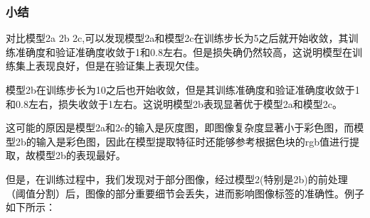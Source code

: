 \subsubsection{小结}
对比模型2a 2b 2c,可以发现模型2a和模型2c在训练步长为5之后就开始收敛，其训练准确度和验证准确度收敛于1和0.8左右。但是损失确仍然较高，这说明模型在训练集上表现良好，但是在验证集上表现欠佳。

模型2b在训练步长为10之后也开始收敛，但是其训练准确度和验证准确度收敛于1和0.8左右，损失收敛于1左右。这说明模型2b表现显著优于模型2a和模型2c。

这可能的原因是模型2a和2c的输入是灰度图，即图像复杂度显著小于彩色图，而模型2b的输入是彩色图，因此在模型提取特征时还能够参考根据色块的rgb值进行提取，故模型2b的表现最好。

但是，在训练过程中，我们发现对于部分图像，经过模型2(特别是2b)的前处理（阈值分割）后，图像的部分重要细节会丢失，进而影响图像标签的准确性。例子如下所示：

